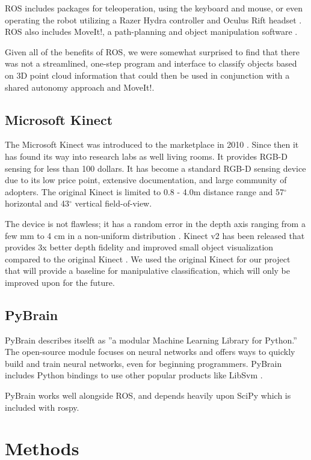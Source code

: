 \documentclass{article}
\begin{document}
ROS includes packages for teleoperation, using the keyboard and mouse, or even operating the robot utilizing a Razer Hydra controller and Oculus Rift headset \cite{surrogate}. ROS also includes MoveIt!, a path-planning and object manipulation software \cite{moveit}. 

Given all of the benefits of ROS, we were somewhat surprised to find that there was not a streamlined, one-step program and interface to classify objects based on 3D point cloud information that could then be used in conjunction with a shared autonomy approach and MoveIt!.

\subsection{Microsoft Kinect}
The Microsoft Kinect was introduced to the marketplace in 2010 \cite{kinectHistory}. Since then 
it has found its way into research labs as well living rooms.
It provides RGB-D sensing for less than 100 dollars. It has become a standard RGB-D
sensing device due to its low price point, extensive documentation, and large community of
adopters. The original Kinect is limited to 0.8 - 4.0m distance range and 57$^{\circ}$ horizontal 
and 43$^{\circ}$ vertical field-of-view. 

The device is not flawless; it has a random error in the depth axis 
ranging from a few mm to 4 cm in a non-uniform distribution \cite{khoshelham2012accuracy,nguyen2012modeling}.
Kinect v2 has been released that provides 3x better depth fidelity and improved small object visualization compared to 
the original Kinect \cite{kinect}. We used the original Kinect for our project that will provide a baseline for manipulative classification, which will only be improved upon for the future.

\subsection{PyBrain}
PyBrain describes itselft as ''a modular Machine Learning Library for Python.'' The open-source module focuses on neural networks and offers ways to quickly build and train neural networks, even for beginning programmers. PyBrain includes Python bindings to use other popular products like LibSvm \cite{pybrain, pybrainCode}.  

PyBrain works well alongside ROS, and depends heavily upon SciPy which is included with rospy.

\section{Methods}
\end{document}
